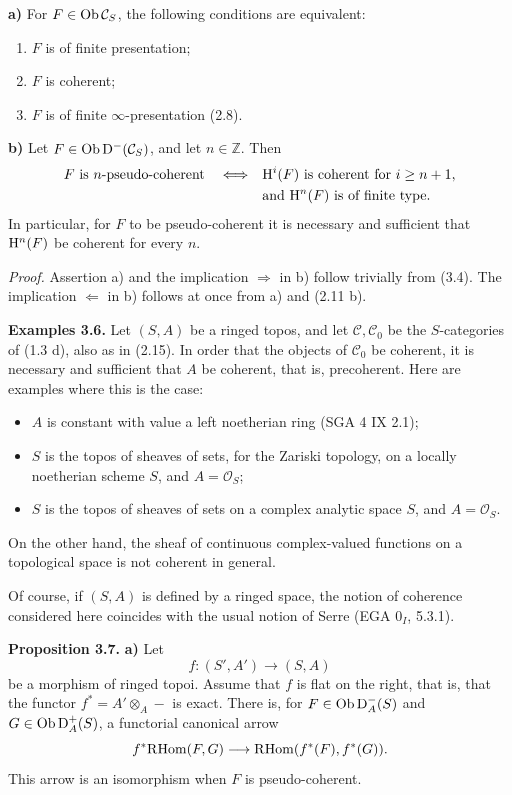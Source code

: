 \documentclass[11pt]{article}
\begin{document}
\textbf{a)} For \(F\in\operatorname{Ob}\mathcal C_S\), the following conditions are equivalent:
\begin{enumerate}[label=(\roman*)]
\item \(F\) is of finite presentation;
\item \(F\) is coherent;
\item \(F\) is of finite \(\infty\)-presentation (2.8).
\end{enumerate}

\textbf{b)} Let \(F\in\operatorname{Ob}\mathrm D^-(\mathcal C_S)\), and let \(n\in\mathbb Z\). Then
\[
\begin{split}
F\text{ is }n\text{-pseudo-coherent}
\quad\Longleftrightarrow\quad&
\mathrm H^i(F)\text{ is coherent for }i\geq n+1,\\
&\text{and }\mathrm H^n(F)\text{ is of finite type.}
\end{split}
\]
In particular, for \(F\) to be pseudo-coherent it is necessary and sufficient that \(\mathrm H^n(F)\) be coherent for every \(n\).

\emph{Proof.} Assertion a) and the implication \(\Rightarrow\) in b) follow trivially from (3.4). The implication \(\Leftarrow\) in b) follows at once from a) and (2.11 b).

\textbf{Examples 3.6.} Let \((S,A)\) be a ringed topos, and let \(\mathcal C,\mathcal C_0\) be the \(S\)-categories of (1.3 d), also as in (2.15). In order that the objects of \(\mathcal C_0\) be coherent, it is necessary and sufficient that \(A\) be coherent, that is, precoherent. Here are examples where this is the case:
\begin{itemize}
\item \(A\) is constant with value a left noetherian ring (SGA 4 IX 2.1);
\item \(S\) is the topos of sheaves of sets, for the Zariski topology, on a locally noetherian scheme \(S\), and \(A=\mathcal O_S\);
\item \(S\) is the topos of sheaves of sets on a complex analytic space \(S\), and \(A=\mathcal O_S\).
\end{itemize}
On the other hand, the sheaf of continuous complex-valued functions on a topological space is not coherent in general.

Of course, if \((S,A)\) is defined by a ringed space, the notion of coherence considered here coincides with the usual notion of Serre (EGA \(0_I\), 5.3.1).

\textbf{Proposition 3.7.} \textbf{a)} Let
\[
  f:(S',A')\longrightarrow(S,A)
\]
be a morphism of ringed topoi. Assume that \(f\) is flat on the right, that is, that the functor \(f^*=A'\otimes_A-\) is exact. There is, for \(F\in\operatorname{Ob}\mathrm D_A^-(S)\) and \(G\in\operatorname{Ob}\mathrm D_A^+(S)\), a functorial canonical arrow
\[
  f^*\mathrm R\!\operatorname{Hom}(F,G)\longrightarrow \mathrm R\!\operatorname{Hom}(f^*(F),f^*(G)).
\]
This arrow is an isomorphism when \(F\) is pseudo-coherent.
\end{document}
